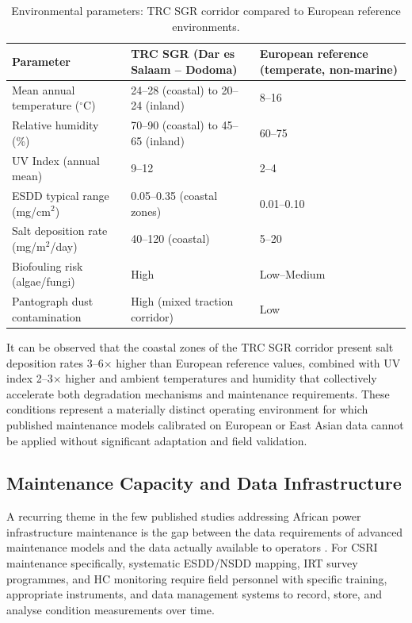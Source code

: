 \documentclass[preprint,12pt,3p]{elsarticle}
\begin{document}
\begin{table}[h]
\centering
\caption{Environmental parameters: TRC SGR corridor compared to
  European reference environments.}
\label{tab:ssa_env}
\begin{tabular}{p{4cm} p{3.5cm} p{3.5cm}}
\toprule
\textbf{Parameter} & \textbf{TRC SGR (Dar es Salaam -- Dodoma)} &
\textbf{European reference (temperate, non-marine)} \\
\midrule
Mean annual temperature ($^\circ$C) & 24--28 (coastal) to 20--24 (inland) &
8--16 \\
Relative humidity (\%) & 70--90 (coastal) to 45--65 (inland) & 60--75 \\
UV Index (annual mean) & 9--12 & 2--4 \\
ESDD typical range (mg/cm$^2$) & 0.05--0.35 (coastal zones) & 0.01--0.10 \\
Salt deposition rate (mg/m$^2$/day) & 40--120 (coastal) & 5--20 \\
Biofouling risk (algae/fungi) & High & Low--Medium \\
Pantograph dust contamination & High (mixed traction corridor) & Low \\
\bottomrule
\end{tabular}
\end{table}

It can be observed that the coastal zones of the TRC SGR corridor
present salt deposition rates 3--6$\times$ higher than European
reference values, combined with UV index 2--3$\times$ higher and
ambient temperatures and humidity that collectively accelerate both
degradation mechanisms and maintenance requirements. These conditions
represent a materially distinct operating environment for which
published maintenance models calibrated on European or East Asian
data cannot be applied without significant adaptation and
field validation.

\subsection{Maintenance Capacity and Data Infrastructure}

A recurring theme in the few published studies addressing African
power infrastructure maintenance is the gap between the data
requirements of advanced maintenance models and the data actually
available to operators \cite{Mbembati2023, WorldBank2022}. For CSRI
maintenance specifically, systematic ESDD/NSDD mapping, IRT survey
programmes, and HC monitoring require field personnel with specific
training, appropriate instruments, and data management systems to
record, store, and analyse condition measurements over time.
\end{document}
